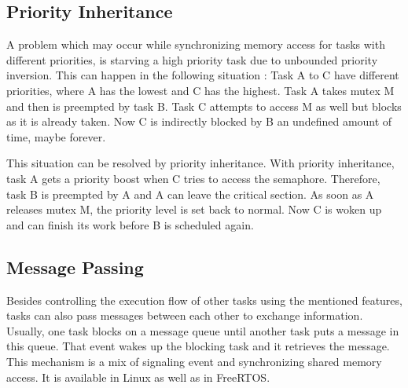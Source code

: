 \subsection{Priority Inheritance}\label{ss_priority_inheritance}
A problem which may occur while synchronizing memory access for tasks with different priorities, is starving a high priority task due to unbounded priority inversion.
This can happen in the following situation \cite{rostedt:iotrtp}:
Task A to C have different priorities, where A has the lowest and C has the highest.
Task A takes mutex M and then is preempted by task B.
Task C attempts to access M as well but blocks as it is already taken.
Now C is indirectly blocked by B an undefined amount of time, maybe forever.
\par
This situation can be resolved by priority inheritance.
With priority inheritance, task A gets a priority boost when C tries to access the semaphore.
Therefore, task B is preempted by A and A can leave the critical section.
As soon as A releases mutex M, the priority level is set back to normal.
Now C is woken up and can finish its work before B is scheduled again.

\subsection{Message Passing}
Besides controlling the execution flow of other tasks using the mentioned features, tasks can also pass messages between each other to exchange information. 
Usually, one task blocks on a message queue until another task puts a message in this queue.
That event wakes up the blocking task and it retrieves the message.
This mechanism is a mix of signaling event and synchronizing shared memory access.
It is available in Linux as well as in FreeRTOS.


